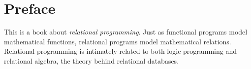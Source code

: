\chapter{Preface}\label{sec:preface}







This is a book about \emph{relational programming}. 
%
Just as functional programs model mathematical functions, relational programs model mathematical relations.
%
Relational programming is intimately related to both logic programming
and relational algebra, the theory behind relational databases.



